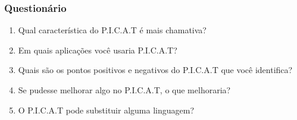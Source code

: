 \documentclass[10pt]{beamer}
\begin{document}

\begin{frame}
    \frametitle{Questionário}
    \begin{enumerate}
     \item Qual característica do P.I.C.A.T é mais chamativa?
     \item Em quais aplicações você usaria P.I.C.A.T?
     \item Quais são os pontos positivos e negativos do P.I.C.A.T que você identifica?
     \item Se pudesse melhorar algo no P.I.C.A.T, o que melhoraria?
     \item O P.I.C.A.T pode substituir alguma linguagem?
    \end{enumerate}
\end{frame}
\end{document}
